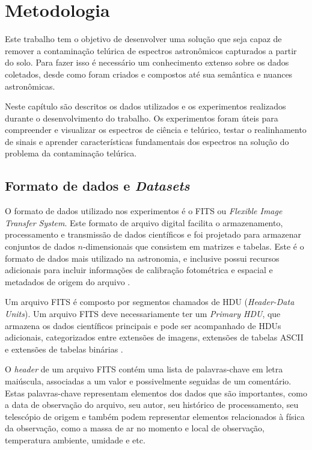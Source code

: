 \chapter{Metodologia}
\label{cap:desenvolvimentos}

Este trabalho tem o objetivo de desenvolver uma solução que seja capaz de remover a contaminação telúrica de espectros astronômicos capturados a partir do solo. Para fazer isso é necessário um conhecimento extenso sobre os dados coletados, desde como foram criados e compostos até sua semântica e nuances astronômicas.  

Neste capítulo são descritos os dados utilizados e os experimentos realizados durante o desenvolvimento do trabalho. Os experimentos foram úteis para compreender e visualizar os espectros de ciência e telúrico, testar o realinhamento de sinais e aprender características fundamentais dos espectros na solução do problema da contaminação telúrica.  

\section{Formato de dados e \textit{Datasets}}

O formato de dados utilizado nos experimentos é o FITS ou \textit{Flexible Image Transfer System}. Este formato de arquivo digital facilita o armazenamento, processamento e transmissão de dados científicos e foi projetado para armazenar conjuntos de dados $n$-dimensionais que consistem em matrizes e tabelas. Este é o formato de dados mais utilizado na astronomia, e inclusive possui recursos adicionais para incluir informações de calibração fotométrica e espacial e metadados de origem do arquivo \citep{pence2010definition}.

Um arquivo FITS é composto por segmentos chamados de HDU (\textit{Header-Data Units}). Um arquivo FITS deve necessariamente ter um \textit{Primary HDU}, que armazena os dados científicos principais e pode ser acompanhado de HDUs adicionais, categorizados entre extensões de imagens, extensões de tabelas ASCII e extensões de tabelas binárias \citep{nasa-fits}.

O \textit{header} de um arquivo FITS contém uma lista de palavras-chave em letra maiúscula, associadas a um valor e possivelmente seguidas de um comentário. Estas palavras-chave representam elementos dos dados que são importantes, como a data de observação do arquivo, seu autor, seu histórico de processamento, seu telescópio de origem e também podem representar elementos relacionados à física da observação, como a massa de ar no momento e local de observação, temperatura ambiente, umidade e etc.

